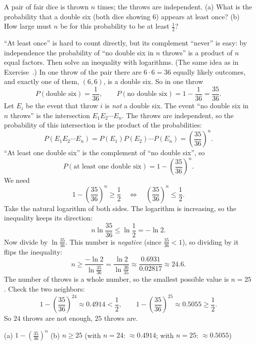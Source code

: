 
\begin{problem}
	A pair of fair dice is thrown $n$ times; the throws are independent.
	(a) What is the probability that a double six (both dice showing $6$)
	appears at least once?
	(b) How large must $n$ be for this probability to be at least $\frac12$?
\end{problem}

\begin{solution}
	\idea ``At least once'' is hard to count directly, but its complement
	``never'' is easy: by independence the probability of ``no double six in
	$n$ throws'' is a product of $n$ equal factors. Then solve an inequality
	with logarithms. (The same idea as in Exercise~.)
	 In one throw of the pair there are $6\cdot6=36$ equally likely
	outcomes, and exactly one of them, $(6,6)$, is a double six. So in one
	throw
	\[ P(\text{double six})=\frac1{36},\qquad
		P(\text{no double six})=1-\frac1{36}=\frac{35}{36}. \]
	Let $E_i$ be the event that throw $i$ is \emph{not} a double six. The event
	``no double six in $n$ throws'' is the intersection $E_1E_2\cdots E_n$.
	The throws are independent, so the probability of this intersection is the
	product of the probabilities:
	\[ P(E_1E_2\cdots E_n)=P(E_1)P(E_2)\cdots P(E_n)
		=\left(\frac{35}{36}\right)^{n}. \]
	``At least one double six'' is the complement of ``no double six'', so
	\[ P(\text{at least one double six})=1-\left(\frac{35}{36}\right)^{n}. \]
	 We need
	\[ 1-\left(\frac{35}{36}\right)^{n}\ge\frac12
		\quad\Longleftrightarrow\quad
		\left(\frac{35}{36}\right)^{n}\le\frac12. \]
	Take the natural logarithm of both sides. The logarithm is increasing, so
	the inequality keeps its direction:
	\[ n\ln\frac{35}{36}\le\ln\frac12=-\ln2. \]
	Now divide by $\ln\frac{35}{36}$. This number is \emph{negative} (since
	$\frac{35}{36}<1$), so dividing by it flips the inequality:
	\[ n\ge\frac{-\ln2}{\ln\frac{35}{36}}=\frac{\ln2}{\ln\frac{36}{35}}
		\approx\frac{0.6931}{0.02817}\approx24.6. \]
	The number of throws is a whole number, so the smallest possible value is
	$n=25$. Check the two neighbors:
	\[ 1-\left(\frac{35}{36}\right)^{24}\approx0.4914<\frac12,
		\qquad
		1-\left(\frac{35}{36}\right)^{25}\approx0.5055\ge\frac12. \]
	So $24$ throws are not enough, $25$ throws are.
	\begin{answer}
		(a) $1-\left(\frac{35}{36}\right)^{n}$ \quad (b) $n\ge25$
		(with $n=24$: $\approx0.4914$; with $n=25$: $\approx0.5055$)

\end{answer}
\end{solution}
